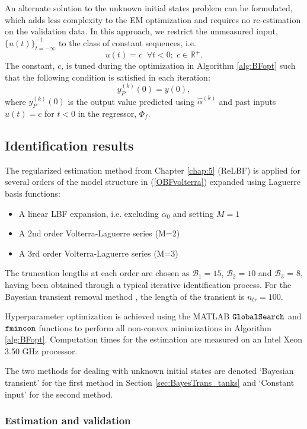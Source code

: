 An alternate solution to the unknown initial states problem can be formulated, which adds less complexity to the EM optimization and requires no re-estimation on the validation data. In this approach, we restrict the unmeasured input, $\{u(t)\}_{t=-\infty}^{-1}$ to the class of constant sequences, i.e.
$$u(t) = c \; \; \forall t<0; \; c \in \mathbb{R}^+.$$ 
The constant, $c$, is tuned during the optimization in Algorithm \ref{alg:BFopt} such that the following condition is satisfied in each iteration: 
$$y_P^{(k)}(0) = y(0),$$ 
where $y_P^{(k)}(0)$ is the output value predicted using $\hat{\alpha}^{(k)}$ and past inputs $u(t)=c$ for $t<0$ in the regressor, $\Phi_f$.  

\subsection{Identification results}
\label{sec:Results_tanks}

The regularized estimation method from Chapter \ref{chap:5} (ReLBF) is applied for several orders of the model structure in (\ref{OBFvolterra}) expanded using Laguerre basis functions:
\begin{itemize}
\item A linear LBF expansion, i.e. excluding $\alpha_0$ and setting $M=1$
\item A 2nd order Volterra-Laguerre series (M=2)
\item A 3rd order Volterra-Laguerre series (M=3)
\end{itemize}

The truncation lengths at each order are chosen as $\mathcal{B}_1 = 15$, $\mathcal{B}_2 = 10$ and $\mathcal{B}_3$ = 8, having been obtained through a typical iterative identification process. For the Bayesian transient removal method \cite{Birpoutsoukis2017b}, the length of the transient is $n_{tr} = 100$.

Hyperparameter optimization is achieved using the MATLAB $\text{\tt{GlobalSearch}}$ and $\text{\tt{fmincon}}$ functions to perform all non-convex minimizations in Algorithm \ref{alg:BFopt}. Computation times for the estimation are measured on an Intel Xeon 3.50 GHz processor.

The two methods for dealing with unknown initial states are denoted `Bayesian transient' for the first method in Section \ref{sec:BayesTrans_tanks} and `Constant input' for the second method.

\subsubsection{Estimation and validation}

